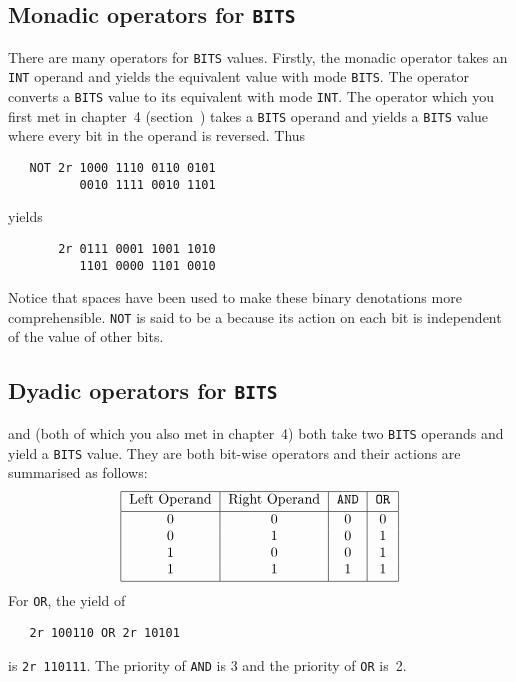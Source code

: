 \subsection*{Monadic operators for \texttt{BITS}}
There are many operators for \verb|BITS| values.  Firstly, the
monadic operator  takes an \verb|INT| operand and yields
the equivalent value with mode \verb|BITS|.  The operator 
converts a \verb|BITS| value to its equivalent with mode \verb|INT|.
The  operator which you first met in chapter~4
(section~) takes a \verb|BITS| operand and yields a
\verb|BITS| value where every bit in the operand is reversed.  Thus
\begin{verbatim}
   NOT 2r 1000 1110 0110 0101
          0010 1111 0010 1101
\end{verbatim}
\noindent
yields
\begin{verbatim}
       2r 0111 0001 1001 1010
          1101 0000 1101 0010
\end{verbatim}
\noindent
Notice that spaces have been used to make these binary denotations
more comprehensible. \verb|NOT| is said to be a
 because its action on each bit is independent of the value
of other bits.

\subsection*{Dyadic operators for \texttt{BITS}}
 and  (both of which you also met in chapter~4)
both take two \verb|BITS| operands and yield a \verb|BITS| value.
They are both bit-wise operators and their actions are summarised as
follows:
$$\begin{tabular}{|c|c|c|c|} \hline
Left Operand&Right Operand&\tt AND&\tt OR\\*[2pt] \hline
      0     &       0     &    0  &   0\\*
      0     &       1     &    0  &   1\\*
      1     &       0     &    0  &   1\\*
      1     &       1     &    1  &   1\\*[2pt] \hline
\end{tabular}$$
For \verb|OR|, the yield of
\begin{verbatim}
   2r 100110 OR 2r 10101
\end{verbatim}
\noindent
is \verb|2r 110111|. The priority of \verb|AND| is 3 and the priority
of \verb|OR| is~2.

